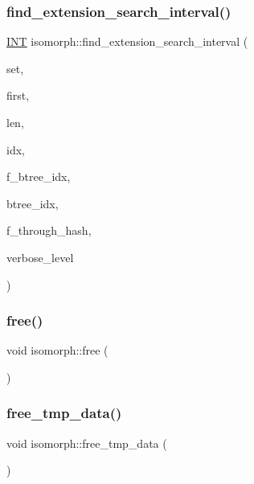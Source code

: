 \subsubsection{\texorpdfstring{find\+\_\+extension\+\_\+search\+\_\+interval()}{find\_extension\_search\_interval()}}
{\footnotesize\ttfamily \mbox{\hyperlink{galois_8h_a09fddde158a3a20bd2dcadb609de11dc}{I\+NT}} isomorph\+::find\+\_\+extension\+\_\+search\+\_\+interval (\begin{DoxyParamCaption}\item[{\mbox{\hyperlink{galois_8h_a09fddde158a3a20bd2dcadb609de11dc}{I\+NT}} $\ast$}]{set,  }\item[{\mbox{\hyperlink{galois_8h_a09fddde158a3a20bd2dcadb609de11dc}{I\+NT}}}]{first,  }\item[{\mbox{\hyperlink{galois_8h_a09fddde158a3a20bd2dcadb609de11dc}{I\+NT}}}]{len,  }\item[{\mbox{\hyperlink{galois_8h_a09fddde158a3a20bd2dcadb609de11dc}{I\+NT}} \&}]{idx,  }\item[{\mbox{\hyperlink{galois_8h_a09fddde158a3a20bd2dcadb609de11dc}{I\+NT}}}]{f\+\_\+btree\+\_\+idx,  }\item[{\mbox{\hyperlink{galois_8h_a09fddde158a3a20bd2dcadb609de11dc}{I\+NT}}}]{btree\+\_\+idx,  }\item[{\mbox{\hyperlink{galois_8h_a09fddde158a3a20bd2dcadb609de11dc}{I\+NT}}}]{f\+\_\+through\+\_\+hash,  }\item[{\mbox{\hyperlink{galois_8h_a09fddde158a3a20bd2dcadb609de11dc}{I\+NT}}}]{verbose\+\_\+level }\end{DoxyParamCaption})}

\mbox{\label{classisomorph_ab34f53c7a2cc10355c0e5f525a64e409}} 
\subsubsection{\texorpdfstring{free()}{free()}}
{\footnotesize\ttfamily void isomorph\+::free (\begin{DoxyParamCaption}{ }\end{DoxyParamCaption})}

\mbox{\label{classisomorph_a353df9e8529d3bde3f9ce96e6dbd2566}} 
\subsubsection{\texorpdfstring{free\+\_\+tmp\+\_\+data()}{free\_tmp\_data()}}
{\footnotesize\ttfamily void isomorph\+::free\+\_\+tmp\+\_\+data (\begin{DoxyParamCaption}{ }\end{DoxyParamCaption})}

